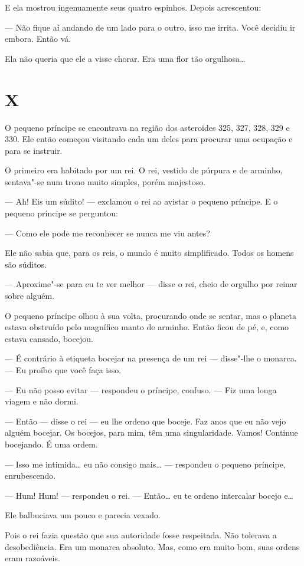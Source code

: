 \begin{Parallel}[p]{}{}
{E ela mostrou ingenuamente seus quatro espinhos. Depois acrescentou:

--- Não fique aí andando de um lado para o outro, isso me irrita. Você
decidiu ir embora. Então vá.

Ela não queria que ele a visse chorar. Era uma flor tão orgulhosa\ldots{}

\section{X}

O pequeno príncipe se encontrava na região dos asteroides 325, 327, 328,
329 e 330. Ele então começou visitando cada um deles para procurar uma
ocupação e para se instruir.

O primeiro era habitado por um rei. O rei, vestido de púrpura e de
arminho, sentava"-se num trono muito simples, porém majestoso.

--- Ah! Eis um súdito! --- exclamou o rei ao avistar o pequeno príncipe. E
o pequeno príncipe se perguntou:

--- Como ele pode me reconhecer se nunca me viu antes?

Ele não sabia que, para os reis, o mundo é muito simplificado. Todos os
homens são súditos.

--- Aproxime"-se para eu te ver melhor --- disse o rei, cheio de orgulho por
reinar sobre alguém.

O pequeno príncipe olhou à sua volta, procurando onde se sentar, mas o
planeta estava obstruído pelo magnífico manto de arminho. Então ficou de
pé, e, como estava cansado, bocejou.

--- É contrário à etiqueta bocejar na presença de um rei --- disse"-lhe o
monarca. --- Eu proíbo que você faça isso.

--- Eu não posso evitar --- respondeu o príncipe, confuso. --- Fiz uma longa
viagem e não dormi.

--- Então --- disse o rei --- eu lhe ordeno que boceje. Faz anos que eu não
vejo alguém bocejar. Os bocejos, para mim, têm uma singularidade. Vamos!
Continue bocejando. É uma ordem.

--- Isso me intimida\ldots{} eu não consigo mais\ldots{} --- respondeu o pequeno
príncipe, enrubescendo.

--- Hum! Hum! --- respondeu o rei. --- Então\ldots{} eu te ordeno intercalar
bocejo e\ldots{}

Ele balbuciava um pouco e parecia vexado.

Pois o rei fazia questão que sua autoridade fosse respeitada. Não
tolerava a desobediência. Era um monarca absoluto. Mas, como era muito
bom, suas ordens eram razoáveis.

}
\end{Parallel}
